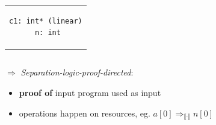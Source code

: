 \documentclass{beamer}
\newcommand{\compsymb}[1]{\llbracket #1 \rrbracket}
\begin{document}
\begin{frame}[fragile]
\begin{columns}
\begin{column}{0.4\textwidth}
\begin{center}
\begin{tabular}{c}
\begin{lstlisting}[style=CStyleNoNum, captionpos = t]
c1: int* (linear)
 n: int
\end{lstlisting}
\end{tabular}
\end{center}

\end{column}
\end{columns}
\vspace{1em}

$\Rightarrow$ \emph{Separation-logic-proof-directed}:
\qquad \begin{itemize}
\item \textbf{proof of} input program used as input
\item operations happen on resources, eg. $a[0] \Rightarrow_{\compsymb{\cdot}} n[0]$
\end{itemize}
\end{frame}

\end{document}
